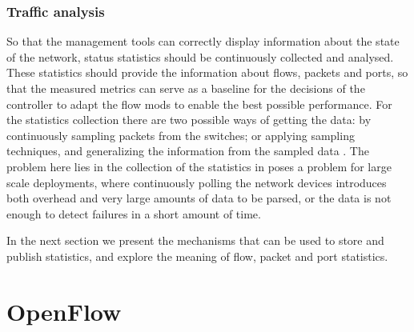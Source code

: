 \subsubsection {Traffic analysis}

So that the management tools can correctly display information about the state of the network, status statistics should be continuously collected and analysed. These statistics should provide the information about flows, packets
and ports, so that the measured metrics can serve as a baseline for the decisions of the controller to adapt the flow mods to enable the best possible performance. For the statistics collection there are two possible ways of 
getting the data: by continuously sampling packets from the switches; or applying sampling techniques, and generalizing the information from the sampled data \cite{CITE - low_overhead_te_elephants_detec}. The problem here lies
in the collection of the statistics in poses a problem for large scale deployments, where continuously polling the network devices introduces both overhead and very large amounts of data to be parsed, or the data is not enough
to detect failures in a short amount of time.
\par In the next section we present the mechanisms that can be used to store and publish statistics, and explore the meaning of flow, packet and port statistics.


\section {OpenFlow}

 

